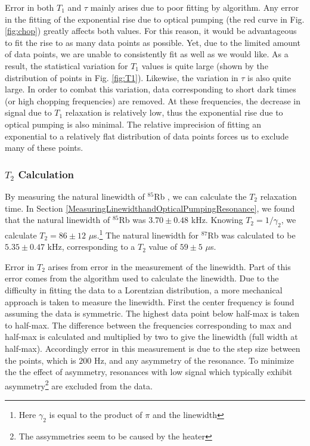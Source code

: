 Error in both $T_1$ and $\tau$ mainly arises due to poor fitting by algorithm.  Any error in the fitting of the exponential rise due to optical pumping (the red curve in Fig. \ref{fig:chop}) greatly affects both values.  For this reason, it would be advantageous to fit the rise to as many data points as possible. Yet, due to the limited amount of data points, we are unable to consistently fit as well as we would like.  As a result, the statistical variation for $T_1$ values is quite large (shown by the distribution of points in Fig. \ref{fig:T1}). Likewise, the variation in $\tau$ is also quite large.  In order to combat this variation, data corresponding to short dark times (or high chopping frequencies) are removed.  At these frequencies, the decrease in signal due to $T_1$ relaxation is relatively low, thus the exponential rise due to optical pumping is also minimal.  The relative imprecision of fitting an exponential to a relatively flat distribution of data points forces us to exclude many of these points.

\subsubsection{$T_{2}$ Calculation}

By measuring the natural linewidth of $^{85}$Rb , we can calculate the $T_2$ relaxation time.  In Section \ref{MeasuringLinewidthandOpticalPumpingResonance}, we found that the natural linewidth of $^{85}$Rb was $3.70 \pm 0.48$ kHz.  Knowing $T_2=1/\gamma_2$, we calculate $T_2 = 86 \pm 12$ $\mu$s.\footnote{Here $\gamma_2$ is equal to the product of $\pi$ and the linewidth} The natural linewidth for $^{87}$Rb was calculated to be $5.35 \pm 0.47$ kHz, corresponding to a $T_2$ value of  $59 \pm 5$ $\mu$s.

Error in $T_2$ arises from error in the measurement of the linewidth. Part of this error comes from the algorithm used to calculate the linewidth.  Due to the difficulty in fitting the data to a Lorentzian distribution, a more mechanical approach is taken to measure the linewidth. First the center frequency is found assuming  the data is symmetric. The highest data point below half-max is taken to half-max.  The difference between the frequencies corresponding to max and half-max is calculated and multiplied by two to give the linewidth (full width at half-max).  Accordingly error in this measurement is due to the step size between the points, which is $200$ Hz, and  any asymmetry of the resonance.  To minimize the the effect of asymmetry, resonances with low signal which typically exhibit asymmetry\footnote{The assymmetries seem to be caused by the heater} are excluded from the data. 

